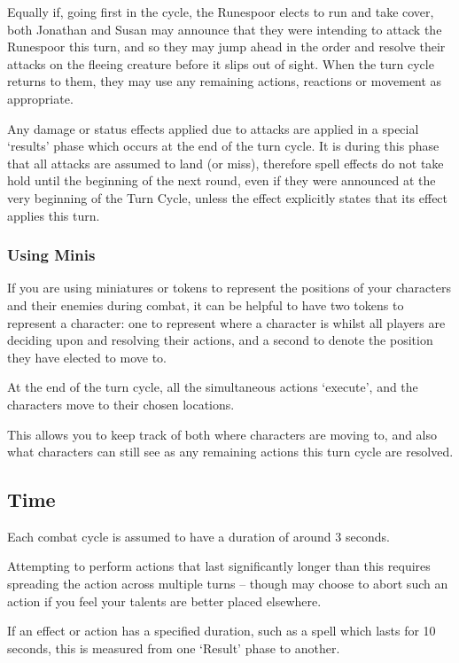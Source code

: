 Equally if, going first in the cycle, the Runespoor elects to run and take cover, both Jonathan and Susan may announce that they were intending to attack the Runespoor this turn, and so they may jump ahead in the order and resolve their attacks on the fleeing creature before it slips out of sight. When the turn cycle returns to them, they may use any remaining actions, reactions or movement as appropriate.

Any damage or status effects applied due to attacks are applied in a special `results' phase which occurs at the end of the turn cycle. It is during this phase that all attacks are assumed to land (or miss), therefore spell effects do not take hold until the beginning of the next round, even if they were announced at the very beginning of the Turn Cycle, unless the effect explicitly states that its effect applies this turn.  



\subsubsection{Using Minis}

If you are using miniatures or tokens to represent the positions of your characters and their enemies during combat, it can be helpful to have two tokens to represent a character: one to represent where a character is whilst all players are deciding upon and resolving their actions, and a second to denote the position they have elected to move to. 

At the end of the turn cycle, all the simultaneous actions `execute', and the characters move to their chosen locations. 

This allows you to keep track of both where characters are moving to, and also what characters can still see as any remaining actions this turn cycle are resolved. 

\subsection{Time}

Each combat cycle is assumed to have a duration of around 3 seconds. 

Attempting to perform actions that last significantly longer than this requires spreading the action across multiple turns -- though may choose to abort such an action if you feel your talents are better placed elsewhere. 

If an effect or action has a specified duration, such as a spell which lasts for 10 seconds, this is measured from one `Result' phase to another. 

